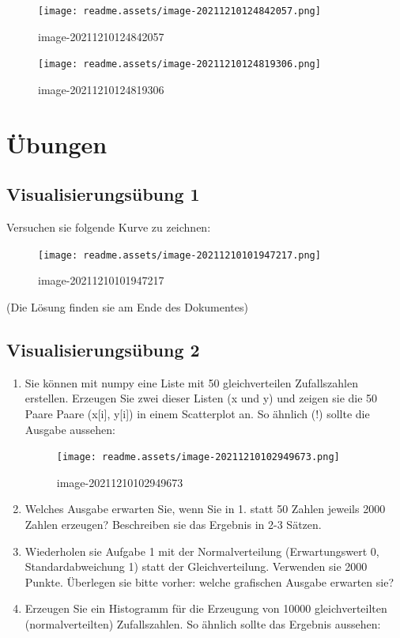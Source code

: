 \documentclass[
  oneside]{book}
\begin{document}
\begin{figure}
\centering
\texttt{[image: readme.assets/image-20211210124842057.png]}
\caption{image-20211210124842057}
\end{figure}

\begin{figure}
\centering
\texttt{[image: readme.assets/image-20211210124819306.png]}
\caption{image-20211210124819306}
\end{figure}

\hypertarget{uxfcbungen}{%
\chapter{Übungen}\label{uxfcbungen}}

\hypertarget{visualisierungsuxfcbung-1}{%
\section{Visualisierungsübung 1}\label{visualisierungsuxfcbung-1}}

Versuchen sie folgende Kurve zu zeichnen:

\begin{figure}
\centering
\texttt{[image: readme.assets/image-20211210101947217.png]}
\caption{image-20211210101947217}
\end{figure}

(Die Lösung finden sie am Ende des Dokumentes)

\hypertarget{visualisierungsuxfcbung-2}{%
\section{Visualisierungsübung 2}\label{visualisierungsuxfcbung-2}}

\begin{enumerate}
\def\labelenumi{\arabic{enumi}.}
\item
  Sie können mit numpy eine Liste mit 50 gleichverteilen Zufallszahlen erstellen. Erzeugen Sie zwei dieser Listen (x und y) und zeigen sie die 50 Paare Paare (x{[}i{]}, y{[}i{]}) in einem Scatterplot an. So ähnlich (!) sollte die Ausgabe aussehen:

  \begin{figure}
  \centering
  \texttt{[image: readme.assets/image-20211210102949673.png]}
  \caption{image-20211210102949673}
  \end{figure}
\item
  Welches Ausgabe erwarten Sie, wenn Sie in 1. statt 50 Zahlen jeweils 2000 Zahlen erzeugen? Beschreiben sie das Ergebnis in 2-3 Sätzen.
\item
  Wiederholen sie Aufgabe 1 mit der Normalverteilung (Erwartungswert 0, Standardabweichung 1) statt der Gleichverteilung. Verwenden sie 2000 Punkte. Überlegen sie bitte vorher: welche grafischen Ausgabe erwarten sie?
\item
  Erzeugen Sie ein Histogramm für die Erzeugung von 10000 gleichverteilten (normalverteilten) Zufallszahlen. So ähnlich sollte das Ergebnis aussehen:
\end{enumerate}
\end{document}
